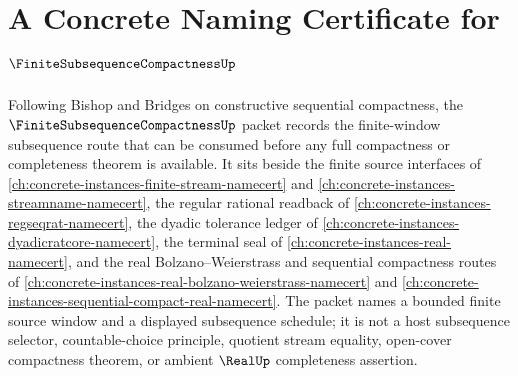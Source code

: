 \chapter{A Concrete Naming Certificate for $\FiniteSubsequenceCompactnessUp$}
\label{ch:concrete-instances-finite-subsequence-compactness-namecert}

Following Bishop and Bridges on constructive sequential compactness, the $\FiniteSubsequenceCompactnessUp$ packet records the finite-window subsequence route that can be consumed before any full compactness or completeness theorem is available. It sits beside the finite source interfaces of \autoref{ch:concrete-instances-finite-stream-namecert} and \autoref{ch:concrete-instances-streamname-namecert}, the regular rational readback of \autoref{ch:concrete-instances-regseqrat-namecert}, the dyadic tolerance ledger of \autoref{ch:concrete-instances-dyadicratcore-namecert}, the terminal seal of \autoref{ch:concrete-instances-real-namecert}, and the real Bolzano--Weierstrass and sequential compactness routes of \autoref{ch:concrete-instances-real-bolzano-weierstrass-namecert} and \autoref{ch:concrete-instances-sequential-compact-real-namecert}. The packet names a bounded finite source window and a displayed subsequence schedule; it is not a host subsequence selector, countable-choice principle, quotient stream equality, open-cover compactness theorem, or ambient $\RealUp$ completeness assertion.

